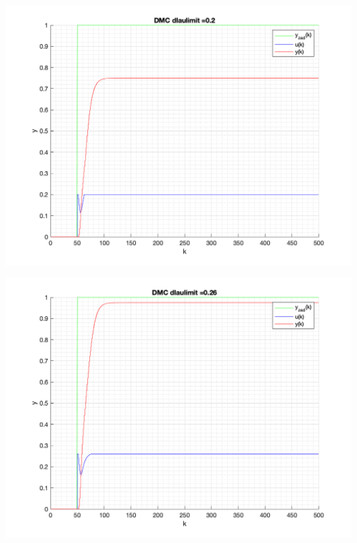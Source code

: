 \documentclass[a4paper, 11pt]{article}
\begin{document}
\begin{enumerate}
\begin{itemize}
 \includegraphics[width=\linewidth]{./ModelsP6_ulimit/P4_DMC_ulimit_0_2_png.png} 
 
 \includegraphics[width=\linewidth]{./ModelsP6_ulimit/P4_DMC_ulimit_0_26_png.png} 
 

\end{itemize}
\end{enumerate}
\end{document}

